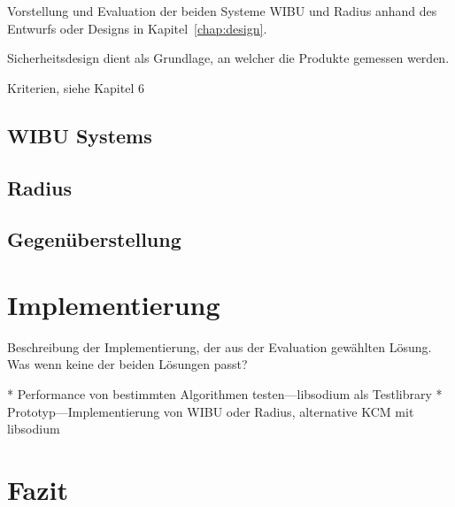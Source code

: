 \documentclass[11pt,a4paper]{report}
\begin{document}
Vorstellung und Evaluation der beiden Systeme WIBU und Radius anhand des Entwurfs oder Designs in Kapitel~\ref{chap:design}.

Sicherheitsdesign dient als Grundlage, an welcher die Produkte gemessen werden.

Kriterien, siehe Kapitel 6
                                            
\section{WIBU Systems}

\section{Radius}

\section{Gegenüberstellung}

\chapter{Implementierung} \label{chap:implementation}

Beschreibung der Implementierung, der aus der Evaluation gewählten Lösung. Was wenn keine der beiden Lösungen passt?

* Performance von bestimmten Algorithmen testen---libsodium als Testlibrary 
* Prototyp---Implementierung von WIBU oder Radius, alternative KCM mit libsodium

\chapter{Fazit}
\end{document}
